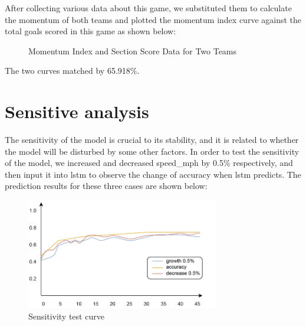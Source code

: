 \documentclass[12pt]{article}  %
\begin{document}
After collecting various data about this game, we substituted them to calculate the momentum of both teams and plotted the momentum index curve against the total goals scored in this game as shown below:

\begin{figure}[htbp]
    \centering    
    \caption{Momentum Index and Section Score Data for Two Teams}		%
    \label{Fig:Flexibility}									%
\end{figure}

The two curves matched by 65.918\%.

\section{Sensitive analysis}

The sensitivity of the model is crucial to its stability, and it is related to whether the model will be disturbed by some other factors. In order to test the sensitivity of the model, we increased and decreased speed\_mph by 0.5\% respectively, and then input it into lstm to observe the change of accuracy when lstm predicts. The prediction results for these three cases are shown below:

\begin{figure}[htbp]
    \centering
    \includegraphics[width=0.75\textwidth]{picture/灵敏度.pdf} 	%
    \caption{Sensitivity test curve}		%
    \label{fig:sensitive_analysis1}							%
\end{figure}
\FloatBarrier
\end{document}
